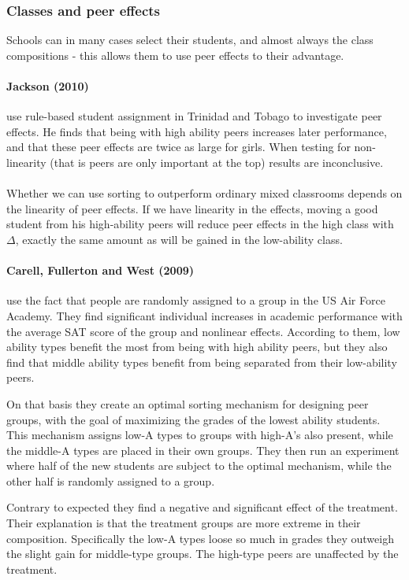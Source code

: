 \documentclass[12pt, a4paper]{article}
\begin{document}
\begin{multicols}{2}
\subsubsection{Classes and peer effects}
Schools can in many cases select their students, and almost always the class compositions - this allows them to use peer effects to their advantage.

\paragraph{Jackson (2010)} use rule-based student assignment in Trinidad and Tobago to investigate peer effects. He finds that being with high ability peers increases later performance, and that these peer effects are twice as large for girls. When testing for non-linearity (that is peers are only important at the top) results are inconclusive.
\\ \\
Whether we can use sorting to outperform ordinary mixed classrooms depends on the linearity of peer effects. If we have linearity in the effects, moving a good student from his high-ability peers will reduce peer effects in the high class with $\Delta$, exactly the same amount as will be gained in the low-ability class.

\paragraph{Carell, Fullerton and West (2009)} use the fact that people are randomly assigned to a group in the US Air Force Academy. They find significant individual increases in academic performance with the average SAT score of the group and nonlinear effects. According to them, low ability types benefit the most from being with high ability peers, but they also find that middle ability types benefit from being separated from their low-ability peers.

On that basis they create an optimal sorting mechanism for designing peer groups, with the goal of maximizing the grades of the lowest ability students. This mechanism assigns low-A types to groups with high-A's also present, while the middle-A types are placed in their own groups. They then run an experiment where half of the new students are subject to the optimal mechanism, while the other half is randomly assigned to a group.

Contrary to expected they find a negative and significant effect of the treatment. Their explanation is that the treatment groups are more extreme in their composition. Specifically the low-A types loose so much in grades they outweigh the slight gain for middle-type groups. The high-type peers are unaffected by the treatment.


\end{multicols}
\end{document}
